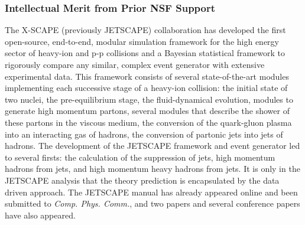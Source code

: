 \documentclass[11pt]{NSFamsart}
\begin{document}
\subsubsection{Intellectual Merit from Prior NSF Support}

The X-SCAPE (previously JETSCAPE) collaboration has developed the first open-source, end-to-end, modular simulation framework for the high energy sector of heavy-ion and p-p collisions and a Bayesian statistical framework to rigorously compare any similar, complex event generator with extensive experimental data. This framework consists of several state-of-the-art modules implementing each successive stage of a heavy-ion collision: the initial state of two nuclei, the pre-equilibrium stage, the fluid-dynamical evolution, modules to generate high momentum partons, several modules that describe the shower of these partons in the viscous medium, the conversion of
the quark-gluon plasma into an interacting gas of hadrons, the conversion of partonic jets into jets of hadrons. The development of the JETSCAPE framework and event generator led to several firsts: the calculation of the suppression of jets, high momentum hadrons from jets, and high momentum heavy hadrons from jets. It is only in the JETSCAPE analysis that the theory prediction is encapsulated by the data driven approach. The JETSCAPE manual has already appeared online \cite{putschke2019jetscape} and been submitted to \textit{Comp. Phys. Comm.}, and two papers \cite{cao2017multistage,kumar2019jetscape} and several conference papers \cite{soltz2018bayesian,tachibana2018jet,kauder2019jetscape,park2019multi} have also appeared.
\end{document}
